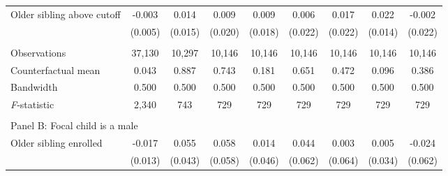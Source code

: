 \begin{table}[!htbp]
{{\begin{tabular}{lcccccccc}
Older sibling above cutoff&      -0.003   &       0.014   &       0.009   &       0.009   &       0.006   &       0.017   &       0.022   &      -0.002   \\
                    &     (0.005)   &     (0.015)   &     (0.020)   &     (0.018)   &     (0.022)   &     (0.022)   &     (0.014)   &     (0.022)   \\
                    &               &               &               &               &               &               &               &               \\
Observations        &      37,130   &      10,297   &      10,146   &      10,146   &      10,146   &      10,146   &      10,146   &      10,146   \\
Counterfactual mean &       0.043   &       0.887   &       0.743   &       0.181   &       0.651   &       0.472   &       0.096   &       0.386   \\
Bandwidth           &       0.500   &       0.500   &       0.500   &       0.500   &       0.500   &       0.500   &       0.500   &       0.500   \\
\textit{F}-statistic&       2,340   &         743   &         729   &         729   &         729   &         729   &         729   &         729   \\
 
&  &  &  &  \\
\multicolumn{10}{l}{Panel B: Focal child is a male} \\
Older sibling enrolled&      -0.017   &       0.055   &       0.058   &       0.014   &       0.044   &       0.003   &       0.005   &      -0.024   \\
                    &     (0.013)   &     (0.043)   &     (0.058)   &     (0.046)   &     (0.062)   &     (0.064)   &     (0.034)   &     (0.062)   \\
 

\end{tabular}}}
\end{table}

